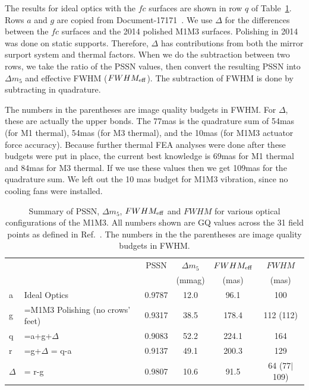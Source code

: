 \documentclass [twoside,openbib,12pt]{article}
\begin{document}
The results for ideal optics with the $fc$ surfaces are shown in row
$q$ of Table~\ref{tab:fwhm}.
Rows $a$ and $g$ are copied from Document-17171~\cite{m1m3perf}.
We use $\Delta$ for the differences between the $fc$ surfaces and the
2014 polished M1M3 surfaces.
Polishing in 2014 was done on static supports.
Therefore, $\Delta$ has contributions from both the mirror surport
system and thermal factors.
When we do the subtraction between two rows, we take the ratio of the
PSSN values, then convert the resulting PSSN into $\Delta m_5$ and
effective FWHM ($FWHM_{\rm eff}$).
The subtraction of FWHM is done by subtracting in quadrature.

The numbers in the parentheses are image quality budgets in FWHM.
For $\Delta$, these are actually the upper bonds.
The 77mas is the quadrature sum of 54mas (for M1 thermal), 54mas (for
M3 thermal), and the 10mas (for M1M3 actuator force accuracy).
Because further thermal FEA analyses were done after these budgets
were put in place, the current best knowledge is 69mas for M1 thermal
and 84mas for M3 thermal.
If we use these values then we get 109mas for the quadrature sum.
We left out the 10 mas budget for M1M3 vibration, since no cooling
    fans were installed.

\begin{table}[bpt]
\caption{Summary of PSSN,  $\Delta m_5$,  $FWHM_{\rm eff}$ and $FWHM$ for various
optical configurations of the M1M3.
All numbers shown are GQ values across the
31 field points as defined in Ref.~\cite{m1m3perf}.
The numbers in the the parentheses are image quality budgets in FWHM.}
\vspace{1mm} \centering
\begin{tabular}{ll|cccc }\hline\hline
&& PSSN & $\Delta m_5$& $FWHM_{\rm eff}$ & $FWHM$ \\
& &  & (mmag)&(mas) &(mas)  \\\hline\hline
a&Ideal Optics &0.9787 & 12.0 & 96.1   & 100    \\
g&=M1M3 Polishing (no crows' feet) &0.9317  & 38.5 & 178.4 & 112 (112)  \\
q&=a+g+$\Delta$ & 0.9083  & 52.2  & 224.1 & 164 \\ \hline
  r& =g+$\Delta$ = q-a & 0.9137 & 49.1 & 200.3 & 129 \\
  $\Delta$ & = r-g & 0.9807 & 10.6 & 91.5 & 64 (77$|$109) \\
\hline
\hline
\end{tabular}
\label{tab:fwhm}
\end{table}
\end{document}
